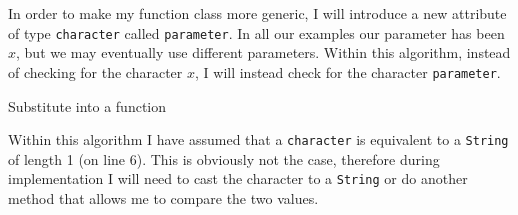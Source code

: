 \documentclass[../../../../../main.tex]{subfiles}
\begin{document}
In order to make my function class more generic, I will introduce a new attribute of type \texttt{character} called \texttt{parameter}. In all our examples our parameter has been $x$, but we may eventually use different parameters. Within this algorithm, instead of checking for the character $x$, I will instead check for the character \texttt{parameter}.
\begin{algorithm}
\caption{Substitute into a function}
\DontPrintSemicolon
{}
\end{algorithm}
Within this algorithm I have assumed that a \texttt{character} is equivalent to a \texttt{String} of length 1 (on line 6). This is obviously not the case, therefore during implementation I will need to cast the character to a \texttt{String} or do another method that allows me to compare the two values.
\newpage
\end{document}
